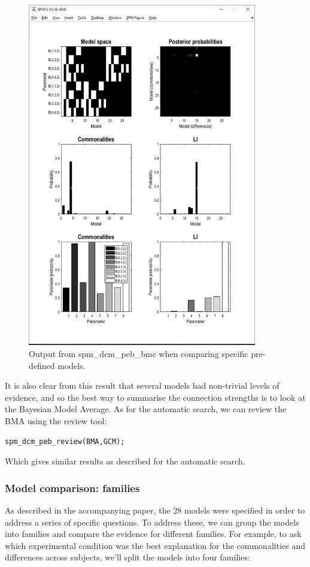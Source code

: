 \documentclass{article}
\begin{document}
\begin{figure}[ht]
\begin{center}
\includegraphics[width=10cm]{"Fig_peb_specific_models_bmc"}
\caption{Output from spm\_dcm\_peb\_bmc when comparing specific pre-defined models.\label{Fig_peb_specific_models_bmc}}
\end{center}
\end{figure}

It is also clear from this result that several models had non-trivial levels of evidence, and so the best way to summarise the connection strengths is to look at the Bayesian Model Average. As for the automatic search, we can review the BMA using the review tool:

\begin{lstlisting}[style=Matlab-editor,caption=PEB review tool]
% Review the BMA
spm_dcm_peb_review(BMA,GCM);
\end{lstlisting}

Which gives similar results as described for the automatic search.

\subsubsection{Model comparison: families}
As described in the accompanying paper, the 28 models were specified in order to address a series of specific questions. To address these, we can group the models into families and compare the evidence for different families. For example, to ask which experimental condition was the best explanation for the commonalities and differences across subjects, we'll split the models into four families:
\end{document}
